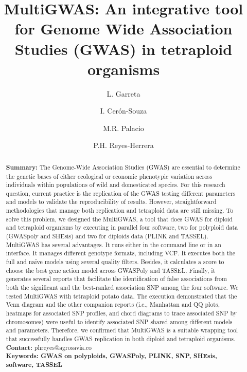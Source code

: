 \documentclass{article}
\begin{document}
\title{MultiGWAS: An integrative tool for Genome Wide Association Studies (GWAS) in tetraploid organisms}

\author[1]{L. Garreta}
\author[1]{I. Cer\'{o}n-Souza}
\author[2]{M.R. Palacio}
\author[1]{P.H. Reyes-Herrera}




\maketitle

\begin{abstract}
\textbf{Summary:} The Genome-Wide Association Studies (GWAS) are essential to determine the genetic bases of either ecological or economic phenotypic variation across individuals within populations of wild and domesticated species. For this research question, current practice is the replication of the GWAS testing different parameters and models to validate the reproducibility of results. However, straightforward methodologies that manage both replication and tetraploid data are still missing. To solve this problem, we designed the MultiGWAS, a tool that does GWAS for diploid and tetraploid organisms by executing in parallel four software, two for polyploid data (GWASpoly and SHEsis) and two for diploids data (PLINK and TASSEL). MultiGWAS has several advantages. It runs either in the command line or in an interface. It manages different genotype formats, including VCF. It executes both the full and naïve models using several quality filters. Besides, it calculates a score to choose the best gene action model across GWASPoly and TASSEL. Finally, it generates several reports that facilitate the identification of false associations from both the significant and the best-ranked association SNP among the four software. We tested MultiGWAS with tetraploid potato data. The execution demonstrated that the Venn diagram and the other companion reports (i.e., Manhattan and QQ plots, heatmaps for associated SNP profiles, and chord diagrams to trace associated SNP by chromosomes) were useful to identify associated SNP shared among different models and parameters. Therefore, we confirmed that MultiGWAS is a suitable wrapping tool that successfully handles GWAS replication in both diploid and tetraploid organisms. \\
\textbf{Contact:} phreyes@agrosavia.co\\
\textbf{Keywords: GWAS on polyploids, GWASPoly, PLINK, SNP, SHEsis, software, TASSEL}
\end{abstract}
\end{document}

